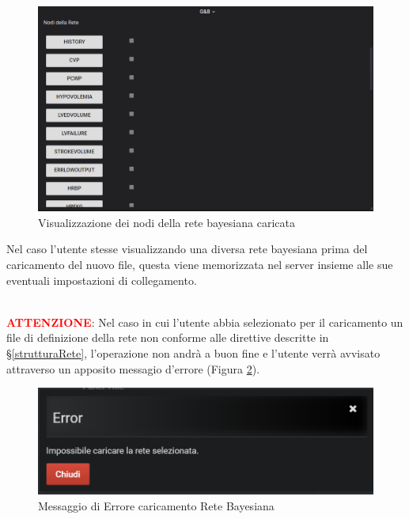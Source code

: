 \begin{figure}[H]
	\begin{center}
		\includegraphics[scale=0.6]{./images/NodiRete.png}
		 \caption{Visualizzazione dei nodi della rete bayesiana caricata}	
		 \label{NodiRete}
	\end{center}
\end{figure}

Nel caso l'utente stesse visualizzando una diversa rete bayesiana prima del caricamento del nuovo file, questa viene memorizzata nel server insieme alle sue eventuali impostazioni di collegamento.

~\\
\textbf{\textcolor{red}{ATTENZIONE}}: Nel caso in cui l'utente abbia selezionato per il caricamento un file di definizione della rete non conforme alle direttive descritte in §\ref{strutturaRete}, l'operazione non andrà a buon fine e l'utente verrà avvisato attraverso un apposito messagio d'errore (Figura \ref{ErroreUpRete}).

\begin{figure}[H]
	\begin{center}
		\includegraphics[scale=0.8]{./images/ErroreUpRete.png}
		 \caption{Messaggio di Errore caricamento Rete Bayesiana}	
		 \label{ErroreUpRete}
	\end{center}
\end{figure}


